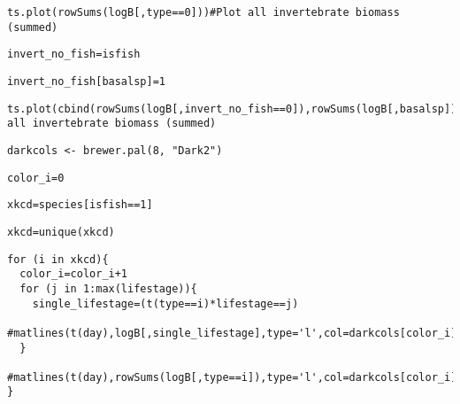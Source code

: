 \documentclass{article}\usepackage[]{graphicx}\usepackage[]{color}
\makeatletter
\newenvironment{kframe}{%
 \def\at@end@of@kframe{}%
 \ifinner\ifhmode%
  \def\at@end@of@kframe{\end{minipage}}%
  \begin{minipage}{\columnwidth}%
 \fi\fi%
 \def\FrameCommand##1{\hskip\@totalleftmargin \hskip-\fboxsep
 \colorbox{shadecolor}{##1}\hskip-\fboxsep
     \hskip-\linewidth \hskip-\@totalleftmargin \hskip\columnwidth}%
 \MakeFramed {\advance\hsize-\width
   \@totalleftmargin\z@ \linewidth\hsize
   \@setminipage}}%
 {\par\unskip\endMakeFramed%
 \at@end@of@kframe}
\newenvironment{knitrout}{}{} %
\makeatother
\begin{document}
\begin{knitrout}
\begin{kframe}
{\ttfamily\noindent\bfseries\color{errorcolor}{\#\# Error in matrix(rep(day, length(basalsp)), ncol = length(basalsp)): object 'day' not found}}\begin{lstlisting}[style=printcode]
ts.plot(rowSums(logB[,type==0]))#Plot all invertebrate biomass (summed)\end{lstlisting}


{\ttfamily\noindent\bfseries\color{errorcolor}{\#\# Error in is.data.frame(x): object 'type' not found}}\begin{lstlisting}[style=printcode]
invert_no_fish=isfish\end{lstlisting}


{\ttfamily\noindent\bfseries\color{errorcolor}{\#\# Error in eval(expr, envir, enclos): object 'isfish' not found}}\begin{lstlisting}[style=printcode]
invert_no_fish[basalsp]=1\end{lstlisting}


{\ttfamily\noindent\bfseries\color{errorcolor}{\#\# Error in invert\_no\_fish[basalsp] = 1: object 'invert\_no\_fish' not found}}\begin{lstlisting}[style=printcode]
ts.plot(cbind(rowSums(logB[,invert_no_fish==0]),rowSums(logB[,basalsp])),col=1:2,lty=1)#Plot all invertebrate biomass (summed)\end{lstlisting}


{\ttfamily\noindent\bfseries\color{errorcolor}{\#\# Error in is.data.frame(x): object 'invert\_no\_fish' not found}}\begin{lstlisting}[style=printcode]
darkcols <- brewer.pal(8, "Dark2")\end{lstlisting}
\begin{lstlisting}[style=printcode]
color_i=0\end{lstlisting}
\begin{lstlisting}[style=printcode]
xkcd=species[isfish==1]\end{lstlisting}


{\ttfamily\noindent\bfseries\color{errorcolor}{\#\# Error in eval(expr, envir, enclos): object 'species' not found}}\begin{lstlisting}[style=printcode]
xkcd=unique(xkcd)\end{lstlisting}


{\ttfamily\noindent\bfseries\color{errorcolor}{\#\# Error in unique(xkcd): object 'xkcd' not found}}\begin{lstlisting}[style=printcode]
for (i in xkcd){
  color_i=color_i+1
  for (j in 1:max(lifestage)){
    single_lifestage=(t(type==i)*lifestage==j)
    #matlines(t(day),logB[,single_lifestage],type='l',col=darkcols[color_i],lty=1+j,lwd=2)
  }
  #matlines(t(day),rowSums(logB[,type==i]),type='l',col=darkcols[color_i],lwd=2)
}\end{lstlisting}


{\ttfamily\noindent\bfseries\color{errorcolor}{\#\# Error in eval(expr, envir, enclos): object 'xkcd' not found}}\end{kframe}
\end{knitrout}
\end{document}
